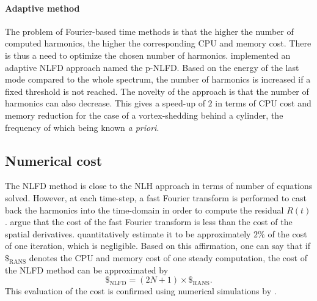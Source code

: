 \paragraph{Adaptive method}
The problem of Fourier-based time methods is that the higher
the number of computed harmonics, the higher the corresponding
CPU and memory cost. There is thus a need to optimize
the chosen number of harmonics.
\citet{Mosahebi2013} implemented an adaptive NLFD approach named
the p-NLFD. Based on the energy of the last mode compared
to the whole spectrum, the number of harmonics
is increased if a fixed threshold is not reached.
The novelty of the approach is that the number of
harmonics can also decrease.
This gives a speed-up of $2$ in terms of CPU cost and
memory reduction for the case of a
vortex-shedding behind a cylinder, the frequency of which
being known \emph{a priori}.

\subsection{Numerical cost}
The NLFD method is close to the NLH approach in terms of number
of equations solved. However, at each time-step, a fast Fourier transform
is performed to cast back the harmonics into the time-domain in order
to compute the residual $R(t)$. \citet{McMullen2006} argue
that the cost of the fast Fourier transform is less than the cost of 
the spatial derivatives. 
\citet{Kachra2008} quantitatively estimate it to be
approximately $2\%$ of the cost of one iteration, which is negligible.
Based on this affirmation, one can say that 
if $\mathdollar_{\text{RANS}}$ 
denotes the CPU and memory cost of
one steady computation, the cost of the NLFD method can be 
approximated by
\begin{equation}
	\mathdollar_{\text{NLFD}} = (2N+1) \times \mathdollar_{\text{RANS}}.
\end{equation}
This evaluation of the cost is confirmed using numerical
simulations by \citet{McMullen2002}.